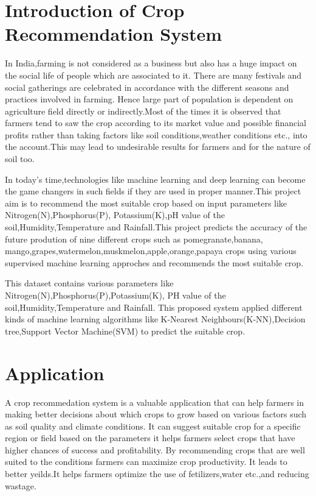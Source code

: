 \section{Introduction of Crop Recommendation System}
      In India,farming is not considered as a business but also has a huge impact on the social life of people which are associated to it. There are many festivals and social gatherings are celebrated in accordance with the different seasons and practices involved in farming. Hence large part of population is dependent on agriculture field directly or indirectly.Most of the times it is observed that farmers tend to saw the crop according to its market value and possible financial profits rather than taking factors like soil conditions,weather conditions etc., into the account.This may lead to undesirable results for farmers and for the nature of soil too.\par
      In today's time,technologies like machine learning and deep learning can become the game changers in such fields if they are used in proper manner.This project aim is to recommend the most suitable crop based on input parameters like Nitrogen(N),Phosphorus(P),
Potassium(K),pH value of the soil,Humidity,Temperature and Rainfall.This project predicts the accuracy of the future prodution of nine different crops such as pomegranate,banana,
mango,grapes,watermelon,muskmelon,apple,orange,papaya crops using various supervised machine learning approches and recommends the most suitable crop.\par This dataset contains various parameters like Nitrogen(N),Phosphorus(P),Potassium(K),
PH value of the soil,Humidity,Temperature and Rainfall. This proposed system applied different kinds of machine learning algorithms like K-Nearest Neighbours(K-NN),Decision tree,Support Vector Machine(SVM) to predict the suitable crop.
\section{Application}
     A crop recommedation system is a valuable application that can help farmers in making better decisions about which crops to grow based on various factors such as soil quality and climate conditions. It can suggest suitable crop for a specific region or field based on the parameters it helps farmers select crops that have higher chances of success and profitability. By recommending crops that are well suited to the conditions farmers can maximize crop productivity. It leads to better yeilds.It helps farmers optimize the use of fetilizers,water etc.,and reducing wastage.
